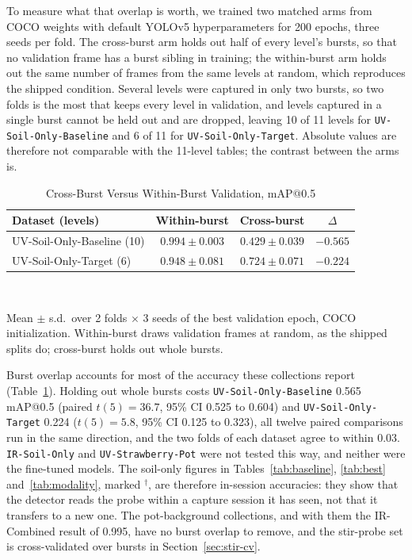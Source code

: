 ﻿\documentclass[journal]{IEEEtran}
\begin{document}
To measure what that overlap is worth, we trained two matched arms from COCO weights with default YOLOv5 hyperparameters for 200 epochs, three seeds per fold. The cross-burst arm holds out half of every level's bursts, so that no validation frame has a burst sibling in training; the within-burst arm holds out the same number of frames from the same levels at random, which reproduces the shipped condition. Several levels were captured in only two bursts, so two folds is the most that keeps every level in validation, and levels captured in a single burst cannot be held out and are dropped, leaving 10 of 11 levels for \texttt{UV-Soil-Only-Baseline} and 6 of 11 for \texttt{UV-Soil-Only-Target}. Absolute values are therefore not comparable with the 11-level tables; the contrast between the arms is.

\begin{table}[!t]
\renewcommand{\arraystretch}{1.3}
\caption{Cross-Burst Versus Within-Burst Validation, mAP@0.5}
\label{tab:burstcv}
\centering
\footnotesize
\setlength{\tabcolsep}{4pt}
\begin{tabular}{l c c c}
\toprule
\textbf{Dataset (levels)} & \textbf{Within-burst} & \textbf{Cross-burst} & \textbf{$\Delta$} \\
\midrule
UV-Soil-Only-Baseline (10) & $0.994 \pm 0.003$ & $0.429 \pm 0.039$ & $-0.565$ \\
UV-Soil-Only-Target (6) & $0.948 \pm 0.081$ & $0.724 \pm 0.071$ & $-0.224$ \\
\bottomrule
\end{tabular}
\\[2pt]
\parbox{\columnwidth}{\footnotesize Mean $\pm$ s.d.\ over 2 folds $\times$ 3 seeds of the best validation epoch, COCO initialization. Within-burst draws validation frames at random, as the shipped splits do; cross-burst holds out whole bursts.}
\end{table}

Burst overlap accounts for most of the accuracy these collections report (Table~\ref{tab:burstcv}). Holding out whole bursts costs \texttt{UV-Soil-Only-Baseline} 0.565 mAP@0.5 (paired $t(5) = 36.7$, 95\% CI 0.525 to 0.604) and \texttt{UV-Soil-Only-Target} 0.224 ($t(5) = 5.8$, 95\% CI 0.125 to 0.323), all twelve paired comparisons run in the same direction, and the two folds of each dataset agree to within 0.03. \texttt{IR-Soil-Only} and \texttt{UV-Strawberry-Pot} were not tested this way, and neither were the fine-tuned models. The soil-only figures in Tables~\ref{tab:baseline}, \ref{tab:best} and~\ref{tab:modality}, marked $^{\dagger}$, are therefore in-session accuracies: they show that the detector reads the probe within a capture session it has seen, not that it transfers to a new one. The pot-background collections, and with them the IR-Combined result of 0.995, have no burst overlap to remove, and the stir-probe set is cross-validated over bursts in Section~\ref{sec:stir-cv}.
\end{document}
